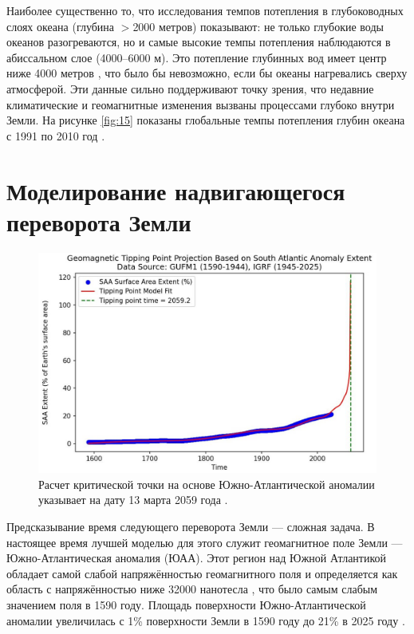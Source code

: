 \documentclass[10pt,twocolumn,letterpaper]{article}
\begin{document}
Наиболее существенно то, что исследования темпов потепления в глубоководных слоях океана (глубина $>$2000 метров) показывают: не только глубокие воды океанов разогреваются, но и самые высокие темпы потепления наблюдаются в абиссальном слое (4000–6000 м). Это потепление глубинных вод имеет центр ниже 4000 метров \cite{132,129}, что было бы невозможно, если бы океаны нагревались сверху атмосферой. Эти данные сильно поддерживают точку зрения, что недавние климатические и геомагнитные изменения вызваны процессами глубоко внутри Земли. На рисунке \ref{fig:15} показаны глобальные темпы потепления глубин океана с 1991 по 2010 год \cite{132}.

\section{Моделирование надвигающегося переворота Земли}

\begin{figure}[b]
\begin{center}
   \includegraphics[width=1\linewidth]{saa-crop.jpeg}
\end{center}
   \caption{Расчет критической точки на основе Южно-Атлантической аномалии указывает на дату 13 марта 2059 года \cite{125,126}.}
\label{fig:16}
\label{fig:onecol}
\end{figure}

Предсказывание время следующего переворота Земли — сложная задача. В настоящее время лучшей моделью для этого служит геомагнитное поле Земли — Южно-Атлантическая аномалия (ЮАА). Этот регион над Южной Атлантикой обладает самой слабой напряжённостью геомагнитного поля и определяется как область с напряжённостью ниже 32000 нанотесла \cite{135}, что было самым слабым значением поля в 1590 году. Площадь поверхности Южно-Атлантической аномалии увеличилась с 1\% поверхности Земли в 1590 году до 21\% в 2025 году \cite{136}.
\end{document}
